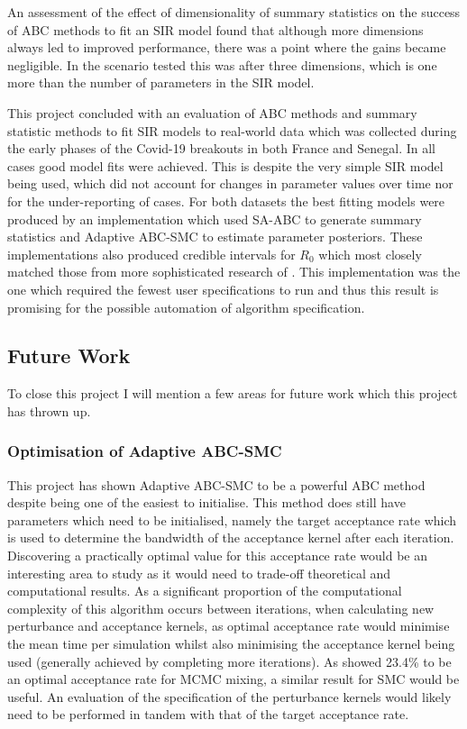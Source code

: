 \documentclass[11pt,a4paper]{article}
\theoremstyle{break}
\begin{document}
  \par An assessment of the effect of dimensionality of summary statistics on the success of ABC methods to fit an SIR model found that although more dimensions always led to improved performance, there was a point where the gains became negligible. In the scenario tested this was after three dimensions, which is one more than the number of parameters in the SIR model.

  \par This project concluded with an evaluation of ABC methods and summary statistic methods to fit SIR models to real-world data which was collected during the early phases of the Covid-19 breakouts in both France and Senegal. In all cases good model fits were achieved. This is despite the very simple SIR model being used, which did not account for changes in parameter values over time nor for the under-reporting of cases. For both datasets the best fitting models were produced by an implementation which used SA-ABC to generate summary statistics and Adaptive ABC-SMC to estimate parameter posteriors. These implementations also produced credible intervals for $R_0$ which most closely matched those from more sophisticated research of \cite[]{estimated_r0_covid_19}. This implementation was the one which required the fewest user specifications to run and thus this result is promising for the possible automation of algorithm specification.

\subsection{Future Work}

  \par To close this project I will mention a few areas for future work which this project has thrown up.

\subsubsection*{Optimisation of Adaptive ABC-SMC}

  \par This project has shown Adaptive ABC-SMC to be a powerful ABC method despite being one of the easiest to initialise. This method does still have parameters which need to be initialised, namely the target acceptance rate which is used to determine the bandwidth of the acceptance kernel after each iteration. Discovering a practically optimal value for this acceptance rate would be an interesting area to study as it would need to trade-off theoretical and computational results. As a significant proportion of the computational complexity of this algorithm occurs between iterations, when calculating new perturbance and acceptance kernels, as optimal acceptance rate would minimise the mean time per simulation whilst also minimising the acceptance kernel being used (generally achieved by completing more iterations). As \cite[]{optimal_scaling_for_various_metropolis_hastings_algorithms} showed 23.4\% to be an optimal acceptance rate for MCMC mixing, a similar result for SMC would be useful. An evaluation of the specification of the perturbance kernels would likely need to be performed in tandem with that of the target acceptance rate.
\end{document}
